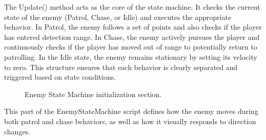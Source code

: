 \documentclass[12pt,oneside,openright,a4paper]{cpe-english-project}
\begin{document}
The Update() method acts as the core of the state machine. It checks the current state of the enemy (Patrol, Chase, or Idle) and executes the appropriate behavior. In Patrol, the enemy follows a set of points and also checks if the player has entered detection range. In Chase, the enemy actively pursues the player and continuously checks if the player has moved out of range to potentially return to patrolling. In the Idle state, the enemy remains stationary by setting its velocity to zero. This structure ensures that each behavior is clearly separated and triggered based on state conditions.\par
 \begin{figure}[!h]
 \centering
\caption{Enemy State Machine initialization section.}\label{fig:ESMini}
\end{figure}
\newpage
This part of the EnemyStateMachine script defines how the enemy moves during both patrol and chase behaviors, as well as how it visually responds to direction changes.
\end{document}

